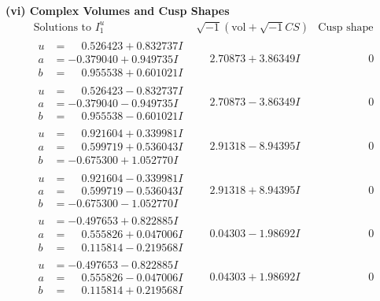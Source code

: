 \documentclass[1p]{elsarticle_modified}
\theoremstyle{definition}
\newcommand{\I}{\sqrt{-1}}
\begin{document}
\newpage\flushleft \textbf{(vi) Complex Volumes and Cusp Shapes}
$$\begin{array}{c|c|c}  
\text{Solutions to }I^u_{1}& \I (\text{vol} + \sqrt{-1}CS) & \text{Cusp shape}\\
 \hline 
\begin{aligned}
u &= \phantom{-}0.526423 + 0.832737 I \\
a &= -0.379040 + 0.949735 I \\
b &= \phantom{-}0.955538 + 0.601021 I\end{aligned}
 & \phantom{-}2.70873 + 3.86349 I & \phantom{-0.000000 } 0 \\ \hline\begin{aligned}
u &= \phantom{-}0.526423 - 0.832737 I \\
a &= -0.379040 - 0.949735 I \\
b &= \phantom{-}0.955538 - 0.601021 I\end{aligned}
 & \phantom{-}2.70873 - 3.86349 I & \phantom{-0.000000 } 0 \\ \hline\begin{aligned}
u &= \phantom{-}0.921604 + 0.339981 I \\
a &= \phantom{-}0.599719 + 0.536043 I \\
b &= -0.675300 + 1.052770 I\end{aligned}
 & \phantom{-}2.91318 - 8.94395 I & \phantom{-0.000000 } 0 \\ \hline\begin{aligned}
u &= \phantom{-}0.921604 - 0.339981 I \\
a &= \phantom{-}0.599719 - 0.536043 I \\
b &= -0.675300 - 1.052770 I\end{aligned}
 & \phantom{-}2.91318 + 8.94395 I & \phantom{-0.000000 } 0 \\ \hline\begin{aligned}
u &= -0.497653 + 0.822885 I \\
a &= \phantom{-}0.555826 + 0.047006 I \\
b &= \phantom{-}0.115814 - 0.219568 I\end{aligned}
 & \phantom{-}0.04303 - 1.98692 I & \phantom{-0.000000 } 0 \\ \hline\begin{aligned}
u &= -0.497653 - 0.822885 I \\
a &= \phantom{-}0.555826 - 0.047006 I \\
b &= \phantom{-}0.115814 + 0.219568 I\end{aligned}
 & \phantom{-}0.04303 + 1.98692 I & \phantom{-0.000000 } 0 \\ \hline\begin{aligned}

\end{aligned}
\end{array}$$
\end{document}
